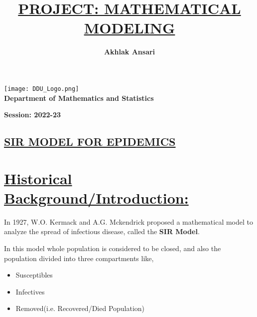 \documentclass[12pt,a4paper]{article}
\title{{\bf \underline{PROJECT: MATHEMATICAL MODELING}}}
\author{\bf Akhlak Ansari}
\begin{document}
    \maketitle

    \pagestyle{fancy}
    \fancyfoot{}
    \color{black}
    \rfoot{\thepage}
    \renewcommand{\footrulewidth}{1pt}

    \begin{center}
      
        \texttt{[image: DDU\_Logo.png]}\\[3mm]
        \textbf{ {\LARGE Department of Mathematics and Statistics}}
       
        \vspace{7.8cm}

        \textbf{Session: 2022-23}

    \end{center}



    \vspace*{0.2cm}

    \begin{center}
        \section*{\underline{\LARGE{{\bf SIR MODEL FOR EPIDEMICS}}}}
    \end{center}

    \section*{\underline{Historical Background/Introduction:}}

    In 1927, W.O. Kermack and A.G. Mckendrick proposed a mathematical model to analyze the spread of infectious disease, called the {\bf SIR Model}.

    In this model whole population is considered to be closed, and also the population divided into three compartments like,
    \begin{itemize}
        \item Susceptibles 
        \item Infectives
        \item Removed(i.e. Recovered/Died Population)
    \end{itemize}
\end{document}
